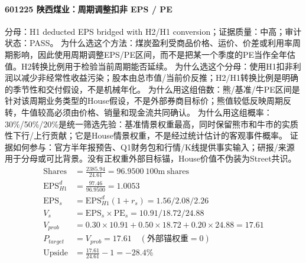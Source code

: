 \paragraph{601225 陕西煤业：周期调整扣非 EPS / PE}
分母：H1 deducted EPS bridged with H2/H1 conversion；证据质量：中高；审计状态：PASS。
为什么选这个方法：煤炭盈利受商品价格、运价、价差或利用率周期影响，因此使用周期调整EPS/PE区间，而不是把某一个季度的PE当作全年估值。H2转换比例用于检验当前周期能否延续。
为什么选这个分母：使用H1扣非利润以减少非经常性收益污染；股本由总市值/当前价反推；H2/H1转换比例是明确的季节性和交付假设，不是机械年化。
为什么用这组倍数：熊/基准/牛PE区间是针对该周期业务类型的House假设，不是外部券商目标价；熊值较低反映周期反转，牛值较高必须由价格、销量和现金流共同确认。
为什么用这组概率：30\%/50\%/20\%是统一筛选先验：基准情景权重最高，同时保留熊市和牛市的实质性下行/上行贡献；它是House情景权重，不是经过统计估计的客观事件概率。
证据如何参与：官方半年报预告、Q1财务包和行情/K线提供事实输入；研报/来源用于分母或可比背景。没有正权重外部目标锚，House价值不伪装为Street共识。
\begin{align*}
\mathrm{Shares} &= \frac{2385.94}{24.61}=96.9500\ \mathrm{100m\ shares}\\
\mathrm{EPS}_{H1}^d &= \frac{97.46}{96.9500}=1.0053\\
\mathrm{EPS}_s &= \mathrm{EPS}_{H1}^d(1+r_s)=1.56/2.08/2.26\\
V_s &= \mathrm{EPS}_s\times \mathrm{PE}_s=10.91/18.72/24.88\\
V_{prob} &= 0.30\times 10.91+0.50\times 18.72+0.20\times 24.88=17.61\\
P_{target} &= V_{prob}=17.61\quad(\text{外部锚权重}=0)\\
\mathrm{Upside} &= \frac{17.61}{24.61}-1=-28.4\%\\
\end{align*}

